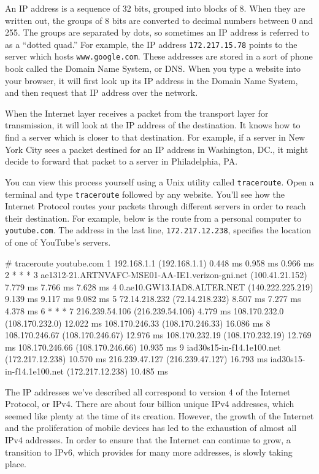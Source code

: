An IP address is a sequence of 32 bits, grouped into blocks of 8. When they are written out, the groups of 8 bits are converted to decimal numbers between 0 and 255. The groups are separated by dots, so sometimes an IP address is referred to as a ``dotted quad.'' For example, the IP address \texttt{172.217.15.78} points to the server which hosts \texttt{www.google.com}. These addresses are stored in a sort of phone book called the Domain Name System, or DNS. When you type a website into your browser, it will first look up its IP address in the Domain Name System, and then request that IP address over the network.

When the Internet layer receives a packet from the transport layer for transmission, it will look at the IP address of the destination. It knows how to find a server which is closer to that destination. For example, if a server in New York City sees a packet destined for an IP address in Washington, DC., it might decide to forward that packet to a server in Philadelphia, PA.

You can view this process yourself using a Unix utility called \texttt{traceroute}. Open a terminal and type \texttt{traceroute} followed by any website. You'll see how the Internet Protocol routes your packets through different servers in order to reach their destination. For example, below is the route from a personal computer to \texttt{youtube.com}. The address in the last line, \texttt{172.217.12.238}, specifies the location of one of YouTube's servers.

\label{code:traceroute}
\begin{monospace}
# traceroute youtube.com
    1  192.168.1.1 (192.168.1.1)  0.448 ms  0.958 ms  0.966 ms
    2  * * *
    3  ae1312-21.ARTNVAFC-MSE01-AA-IE1.verizon-gni.net (100.41.21.152)  7.779 ms  7.766 ms  7.628 ms
    4  0.ae10.GW13.IAD8.ALTER.NET (140.222.225.219)  9.139 ms  9.117 ms  9.082 ms
    5  72.14.218.232 (72.14.218.232)  8.507 ms  7.277 ms  4.378 ms
    6  * * *
    7  216.239.54.106 (216.239.54.106)  4.779 ms 108.170.232.0 (108.170.232.0)  12.022 ms 108.170.246.33 (108.170.246.33)  16.086 ms
    8  108.170.246.67 (108.170.246.67)  12.976 ms 108.170.232.19 (108.170.232.19)  12.769 ms 108.170.246.66 (108.170.246.66)  10.935 ms
    9  iad30s15-in-f14.1e100.net (172.217.12.238)  10.570 ms 216.239.47.127 (216.239.47.127)  16.793 ms iad30s15-in-f14.1e100.net (172.217.12.238)  10.485 ms
\end{monospace}

The IP addresses we've described all correspond to version 4 of the Internet Protocol, or IPv4. There are about four billion unique IPv4 addresses, which seemed like plenty at the time of its creation. However, the growth of the Internet and the proliferation of mobile devices has led to the exhaustion of almost all IPv4 addresses. In order to ensure that the Internet can continue to grow, a transition to IPv6, which provides for many more addresses, is slowly taking place.

